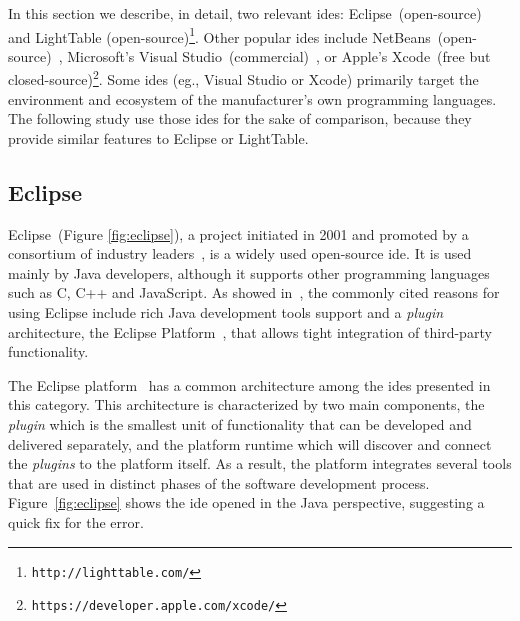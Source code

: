 In this section we describe, in detail, two relevant \glspl{ide}: Eclipse~(open-source)~\citep{carlson2005eclipse} and LightTable (open-source)\footnote{\label{fnote:lt}\texttt{http://lighttable.com/}}. Other popular \glspl{ide} include NetBeans~(open-source)~\citep{boudreau2002netbeans}, Microsoft's Visual Studio~(commercial)~\citep{guckenheimer2006software}, or Apple's Xcode~(free but closed-source)\footnote{\texttt{https://developer.apple.com/xcode/}}. Some \glspl{ide} (eg., Visual Studio or Xcode) primarily target the environment and ecosystem of the manufacturer's own programming languages.  The following study use those \glspl{ide} for the sake of comparison, because they provide similar features to Eclipse or LightTable.

\subsection{Eclipse} 
\label{subsec:eclipse}
Eclipse~(Figure \ref{fig:eclipse}), a project initiated in 2001 and promoted by a consortium of industry leaders~\citep{carlson2005eclipse}, is a widely used open-source \gls{ide}. It is used mainly by Java developers, although it supports other programming languages such as C, C++ and JavaScript. As showed in~\citep{murphy2006java}, the commonly cited reasons for using Eclipse include rich Java development tools support and a \textit{plugin} architecture, the Eclipse Platform~\citep{DesRivieres2004}, that allows tight integration of third-party functionality.

The Eclipse platform~\citep{DesRivieres2004} has a common architecture among the \glspl{ide} presented in this category. This architecture is characterized by two main components, the \textit{plugin} which is the smallest unit of functionality that can be developed and delivered separately, and the platform runtime which will discover and connect the \textit{plugins} to the platform itself. As a result, the platform integrates several tools that are used in distinct phases of the software development process. Figure~\ref{fig:eclipse} shows the \gls{ide} opened in the Java perspective, suggesting a quick fix for the error.


